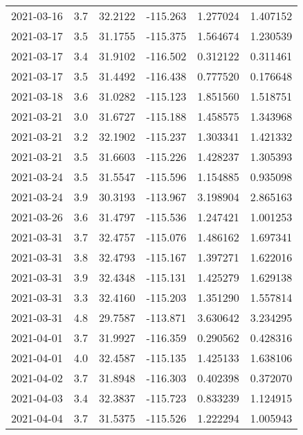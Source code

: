 \begin{tabular}{lrrrrr}
2021-03-16 &       3.7 &  32.2122 &  -115.263 &         1.277024 &         1.407152 \\
2021-03-17 &       3.5 &  31.1755 &  -115.375 &         1.564674 &         1.230539 \\
2021-03-17 &       3.4 &  31.9102 &  -116.502 &         0.312122 &         0.311461 \\
2021-03-17 &       3.5 &  31.4492 &  -116.438 &         0.777520 &         0.176648 \\
2021-03-18 &       3.6 &  31.0282 &  -115.123 &         1.851560 &         1.518751 \\
2021-03-21 &       3.0 &  31.6727 &  -115.188 &         1.458575 &         1.343968 \\
2021-03-21 &       3.2 &  32.1902 &  -115.237 &         1.303341 &         1.421332 \\
2021-03-21 &       3.5 &  31.6603 &  -115.226 &         1.428237 &         1.305393 \\
2021-03-24 &       3.5 &  31.5547 &  -115.596 &         1.154885 &         0.935098 \\
2021-03-24 &       3.9 &  30.3193 &  -113.967 &         3.198904 &         2.865163 \\
2021-03-26 &       3.6 &  31.4797 &  -115.536 &         1.247421 &         1.001253 \\
2021-03-31 &       3.7 &  32.4757 &  -115.076 &         1.486162 &         1.697341 \\
2021-03-31 &       3.8 &  32.4793 &  -115.167 &         1.397271 &         1.622016 \\
2021-03-31 &       3.9 &  32.4348 &  -115.131 &         1.425279 &         1.629138 \\
2021-03-31 &       3.3 &  32.4160 &  -115.203 &         1.351290 &         1.557814 \\
2021-03-31 &       4.8 &  29.7587 &  -113.871 &         3.630642 &         3.234295 \\
2021-04-01 &       3.7 &  31.9927 &  -116.359 &         0.290562 &         0.428316 \\
2021-04-01 &       4.0 &  32.4587 &  -115.135 &         1.425133 &         1.638106 \\
2021-04-02 &       3.7 &  31.8948 &  -116.303 &         0.402398 &         0.372070 \\
2021-04-03 &       3.4 &  32.3837 &  -115.723 &         0.833239 &         1.124915 \\
2021-04-04 &       3.7 &  31.5375 &  -115.526 &         1.222294 &         1.005943 \\

\end{tabular}
